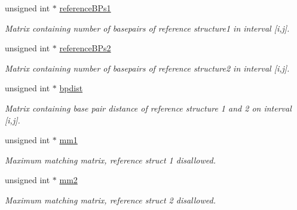 \begin{Indent}
\begin{DoxyCompactItemize}
unsigned int $\ast$ \hyperlink{group__fold__compound_a62a8d4ab8dadffbf09da917adff6c71e}{reference\+B\+Ps1}
\begin{DoxyCompactList}\small\item\em Matrix containing number of basepairs of reference structure1 in interval \mbox{[}i,j\mbox{]}. \end{DoxyCompactList}\item 
\mbox{\label{group__fold__compound_a19187f33433e84683730dedff8544f71}} 
unsigned int $\ast$ \hyperlink{group__fold__compound_a19187f33433e84683730dedff8544f71}{reference\+B\+Ps2}
\begin{DoxyCompactList}\small\item\em Matrix containing number of basepairs of reference structure2 in interval \mbox{[}i,j\mbox{]}. \end{DoxyCompactList}\item 
\mbox{\label{group__fold__compound_a5c53e55583ce096148075bc240fc2bce}} 
unsigned int $\ast$ \hyperlink{group__fold__compound_a5c53e55583ce096148075bc240fc2bce}{bpdist}
\begin{DoxyCompactList}\small\item\em Matrix containing base pair distance of reference structure 1 and 2 on interval \mbox{[}i,j\mbox{]}. \end{DoxyCompactList}\item 
\mbox{\label{group__fold__compound_a0af5a888bac2ae32107da32776144504}} 
unsigned int $\ast$ \hyperlink{group__fold__compound_a0af5a888bac2ae32107da32776144504}{mm1}
\begin{DoxyCompactList}\small\item\em Maximum matching matrix, reference struct 1 disallowed. \end{DoxyCompactList}\item 
\mbox{\label{group__fold__compound_a54c0b979274b285a7e093ed54aa3252e}} 
unsigned int $\ast$ \hyperlink{group__fold__compound_a54c0b979274b285a7e093ed54aa3252e}{mm2}
\begin{DoxyCompactList}\small\item\em Maximum matching matrix, reference struct 2 disallowed. \end{DoxyCompactList}\end{DoxyCompactItemize}
\end{Indent}
